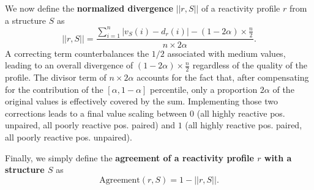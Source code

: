 \documentclass[11pt]{article} %
\begin{document}
We now define the {\bf normalized divergence} $||r,S||$ of a reactivity profile $r$ from a structure $S$ as
$$ ||r,S|| = \frac{\sum_{i=1}^n |v_S(i)-d_r(i)|-(1-2\alpha)\times \frac{n}{2}}{n\times 2\alpha}.$$
A correcting term counterbalances the $1/2$ associated with medium values, leading to an overall divergence of $(1-2\alpha)\times \frac{n}{2}$ regardless of the quality of the profile. The divisor term of $n\times 2\alpha$ accounts for the fact that, after compensating for the contribution of the $[\alpha,1-\alpha]$ percentile, only a proportion $2\alpha$ of the original values is effectively covered by the sum. Implementing those two corrections leads to a final value scaling between $0$ (all highly reactive pos. unpaired, all poorly reactive pos. paired) and $1$ (all highly reactive pos. paired, all poorly reactive pos. unpaired). 

Finally, we simply define the {\bf agreement of a reactivity profile $r$ with a structure $S$} as
$$ \text{Agreement}(r,S) = 1- ||r,S||.$$
\end{document}
